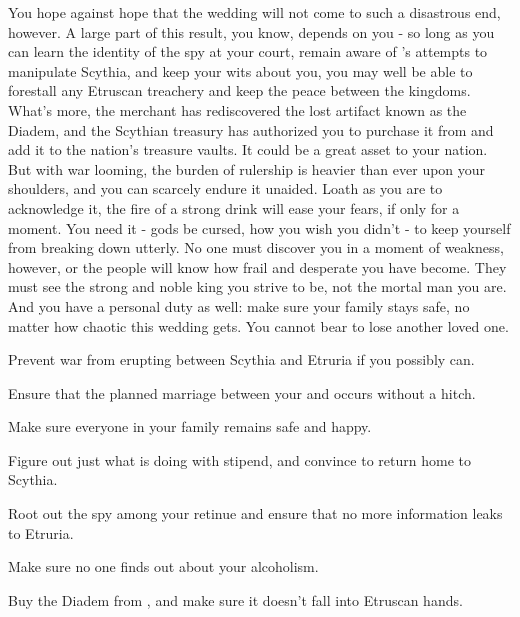 \documentclass[char]{Kos}
\begin{document}
You hope against hope that the wedding will not come to such a disastrous end, however. A large part of this result, you know, depends on you - so long as you can learn the identity of the spy at your court, remain aware of \cEtruriaKing{}'s attempts to manipulate Scythia, and keep your wits about you, you may well be able to forestall any Etruscan treachery and keep the peace between the kingdoms. What's more, the merchant \cMerchant{} has rediscovered the lost artifact known as the Diadem, and the Scythian treasury has authorized you to purchase it from \cMerchant{\them} and add it to the nation's treasure vaults. It could be a great asset to your nation. But with war looming, the burden of rulership is heavier than ever upon your shoulders, and you can scarcely endure it unaided. Loath as you are to acknowledge it, the fire of a strong drink will ease your fears, if only for a moment. You need it - gods be cursed, how you wish you didn't - to keep yourself from breaking down utterly. No one must discover you in a moment of weakness, however, or the people will know how frail and desperate you have become. They must see the strong and noble king you strive to be, not the mortal man you are. And you have a personal duty as well: make sure your family stays safe, no matter how chaotic this wedding gets. You cannot bear to lose another loved one.


\begin{itemz}[Goals]
\item Prevent war from erupting between Scythia and Etruria if you possibly can.
\item Ensure that the planned marriage between your \cBride{\offspring} and \cGroom{} occurs without a hitch.
\item Make sure everyone in your family remains safe and happy.
\item Figure out just what \cWard{} is doing with \cWard{\their} stipend, and convince \cWard{\them} to return home to Scythia.
\item Root out the spy among your retinue and ensure that no more information leaks to Etruria.
\item Make sure no one finds out about your alcoholism.
\item Buy the Diadem from \cMerchant{}, and make sure it doesn't fall into Etruscan hands.
\end{itemz}
\end{document}
